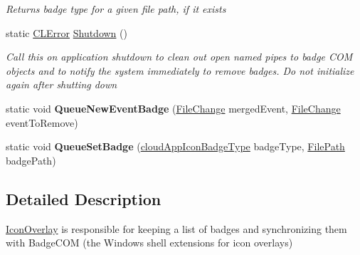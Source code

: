 \begin{DoxyCompactItemize}
\begin{DoxyCompactList}\small\item\em Returns badge type for a given file path, if it exists \end{DoxyCompactList}\item 
static \hyperlink{class_cloud_api_public_1_1_model_1_1_c_l_error}{C\-L\-Error} \hyperlink{class_cloud_api_public_1_1_badge_n_e_t_1_1_icon_overlay_a8f74dc2eee27f8f712f9588c7150c8fd}{Shutdown} ()
\begin{DoxyCompactList}\small\item\em Call this on application shutdown to clean out open named pipes to badge C\-O\-M objects and to notify the system immediately to remove badges. Do not initialize again after shutting down \end{DoxyCompactList}\item 
\hypertarget{class_cloud_api_public_1_1_badge_n_e_t_1_1_icon_overlay_ab43988af96d0decabbb8e67a7f52f970}{static void {\bfseries Queue\-New\-Event\-Badge} (\hyperlink{class_cloud_api_public_1_1_model_1_1_file_change}{File\-Change} merged\-Event, \hyperlink{class_cloud_api_public_1_1_model_1_1_file_change}{File\-Change} event\-To\-Remove)}\label{class_cloud_api_public_1_1_badge_n_e_t_1_1_icon_overlay_ab43988af96d0decabbb8e67a7f52f970}

\item 
\hypertarget{class_cloud_api_public_1_1_badge_n_e_t_1_1_icon_overlay_a597856e231a8e6ab43484b854f83b249}{static void {\bfseries Queue\-Set\-Badge} (\hyperlink{namespace_cloud_api_public_1_1_badge_n_e_t_afab91a750338fef6bd4ef08f5381c4e4}{cloud\-App\-Icon\-Badge\-Type} badge\-Type, \hyperlink{class_cloud_api_public_1_1_model_1_1_file_path}{File\-Path} badge\-Path)}\label{class_cloud_api_public_1_1_badge_n_e_t_1_1_icon_overlay_a597856e231a8e6ab43484b854f83b249}

\end{DoxyCompactItemize}


\subsection{Detailed Description}
\hyperlink{class_cloud_api_public_1_1_badge_n_e_t_1_1_icon_overlay}{Icon\-Overlay} is responsible for keeping a list of badges and synchronizing them with Badge\-C\-O\-M (the Windows shell extensions for icon overlays) 




